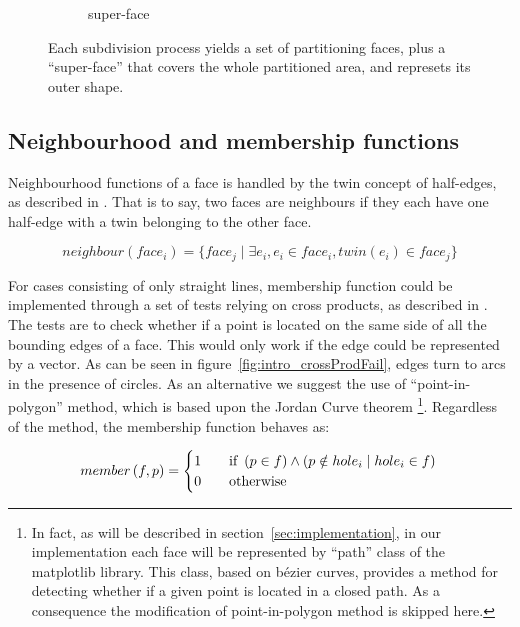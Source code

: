 \begin{figure}
\begin{subfigure}{.32\textwidth}
    \caption{super-face} \label{subfig:subd_superface_c}
  \end{subfigure}%
  \caption[xxx]
          {Each subdivision process yields a set of partitioning faces, plus a ``super-face'' that covers the whole partitioned area, and represets its outer shape.}
  \label{fig:subd_superface}
\end{figure}

\subsection{Neighbourhood and membership functions} \label{subsec:memberNeighbour}

Neighbourhood functions of a face is handled by the twin concept of half-edges, as described in \cite{de2000computational}.
That is to say, two faces are neighbours if they each have one half-edge with a twin belonging to the other face.

\[
neighbour\left(face_i\right) = \lbrace  face_j \mid \exists e_i, e_i \in face_i, \mathit{twin}(e_i) \in face_j \rbrace
\]

For cases consisting of only straight lines, membership function could be implemented through a set of tests relying on cross products, as described in \cite{de2000computational}.
The tests are to check whether if a point is located on the same side of all the bounding edges of a face.
This would only work if the edge could be represented by a vector.
As can be seen in figure~\ref{fig:intro_crossProdFail}, edges turn to arcs in the presence of circles.
As an alternative we suggest the use of ``point-in-polygon'' method, which is based upon the Jordan Curve theorem \footnote{In fact, as will be described in section~\ref{sec:implementation}, in our implementation each face will be represented by ``path'' class of the matplotlib library. This class, based on b\'ezier curves, provides a method for detecting whether if a given point is located in a closed path. As a consequence the modification of point-in-polygon method is skipped here.}.
Regardless of the method, the membership function behaves as:

\[
member\left(f,p\right) =
\begin{cases}
  1 & \quad \text{if } \left(p \in f\right) \land \left(p \notin hole_i \mid hole_i \in f\right) \\
  0 & \quad \text{otherwise} \\
\end{cases}\\
\]

